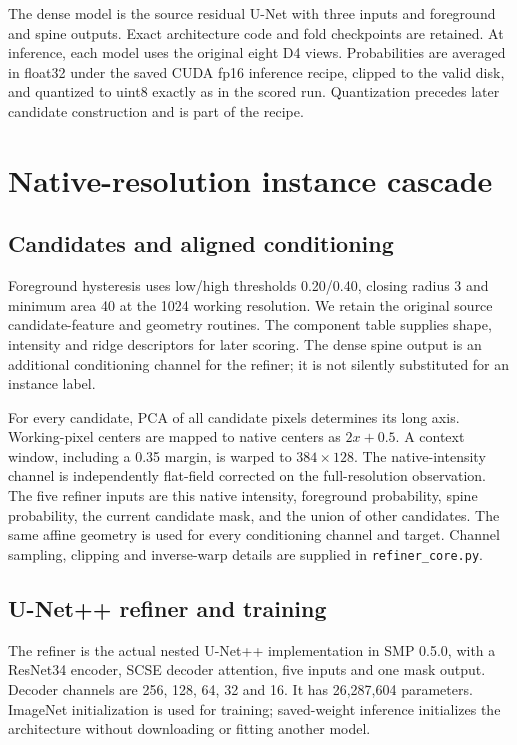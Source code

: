 \documentclass[sigconf]{acmart}
\begin{document}
The dense model is the source residual U-Net with three inputs and foreground and spine outputs. Exact architecture code and fold checkpoints are retained. At inference, each model uses the original eight D4 views. Probabilities are averaged in float32 under the saved CUDA fp16 inference recipe, clipped to the valid disk, and quantized to uint8 exactly as in the scored run. Quantization precedes later candidate construction and is part of the recipe.

\clearpage
\section{Native-resolution instance cascade}
\subsection{Candidates and aligned conditioning}
Foreground hysteresis uses low/high thresholds 0.20/0.40, closing radius 3 and minimum area 40 at the 1024 working resolution. We retain the original source candidate-feature and geometry routines. The component table supplies shape, intensity and ridge descriptors for later scoring. The dense spine output is an additional conditioning channel for the refiner; it is not silently substituted for an instance label.

For every candidate, PCA of all candidate pixels determines its long axis. Working-pixel centers are mapped to native centers as $2x+0.5$. A context window, including a 0.35 margin, is warped to $384\times128$. The native-intensity channel is independently flat-field corrected on the full-resolution observation. The five refiner inputs are this native intensity, foreground probability, spine probability, the current candidate mask, and the union of other candidates. The same affine geometry is used for every conditioning channel and target. Channel sampling, clipping and inverse-warp details are supplied in \texttt{refiner\_core.py}.

\subsection{U-Net++ refiner and training}
The refiner is the actual nested U-Net++ implementation in SMP 0.5.0, with a ResNet34 encoder, SCSE decoder attention, five inputs and one mask output. Decoder channels are 256, 128, 64, 32 and 16. It has 26,287,604 parameters. ImageNet initialization is used for training; saved-weight inference initializes the architecture without downloading or fitting another model.
\end{document}
